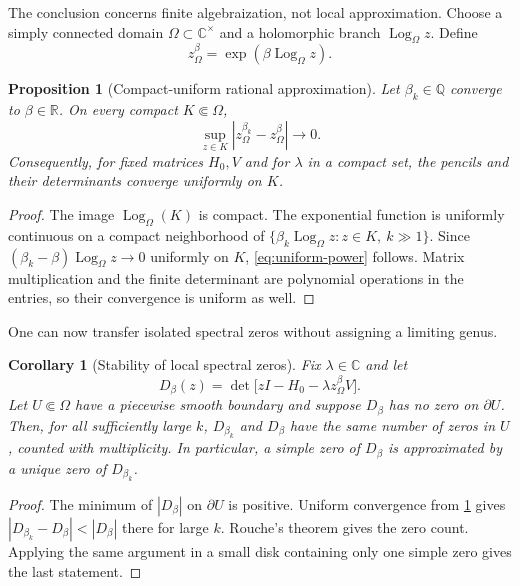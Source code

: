 \documentclass[11pt,reqno]{amsart}
\newtheorem{proposition}[theorem]{Proposition}
\newtheorem{corollary}[theorem]{Corollary}
\theoremstyle{remark}
\newcommand{\C}{\mathbb C}
\newcommand{\R}{\mathbb R}
\newcommand{\Q}{\mathbb Q}
\newcommand{\Log}{\operatorname{Log}}
\begin{document}
The conclusion concerns finite algebraization, not local approximation.
Choose a simply connected domain $\Omega\subset\C^\times$ and a holomorphic
branch $\Log_\Omega z$.  Define
\begin{equation}\label{eq:branch-power}
 z^\beta_\Omega=\exp(\beta\Log_\Omega z).
\end{equation}

\begin{proposition}[Compact-uniform rational approximation]
\label{prop:rational-approximation}
Let $\beta_k\in\Q$ converge to $\beta\in\R$.  On every compact
$K\Subset\Omega$,
\begin{equation}\label{eq:uniform-power}
 \sup_{z\in K}|z^{\beta_k}_\Omega-z^\beta_\Omega|\longrightarrow0.
\end{equation}
Consequently, for fixed matrices $H_0,V$ and for $\lambda$ in a compact set,
the pencils and their determinants converge uniformly on $K$.
\end{proposition}

\begin{proof}
The image $\Log_\Omega(K)$ is compact.  The exponential function is uniformly
continuous on a compact neighborhood of
$\{\beta_k\Log_\Omega z:z\in K,\ k\gg1\}$.  Since
$(\beta_k-\beta)\Log_\Omega z\to0$ uniformly on $K$,
\eqref{eq:uniform-power} follows.  Matrix multiplication and the finite
determinant are polynomial operations in the entries, so their convergence
is uniform as well.
\end{proof}

One can now transfer isolated spectral zeros without assigning a limiting
genus.

\begin{corollary}[Stability of local spectral zeros]\label{cor:zero-stability}
Fix $\lambda\in\C$ and let
\begin{equation}\label{eq:D-beta}
 D_\beta(z)=\det\bigl[zI-H_0-\lambda z^\beta_\Omega V\bigr].
\end{equation}
Let $U\Subset\Omega$ have a piecewise smooth boundary and suppose
$D_\beta$ has no zero on $\partial U$.  Then, for all sufficiently large
$k$, $D_{\beta_k}$ and $D_\beta$ have the same number of zeros in $U$,
counted with multiplicity.  In particular, a simple zero of $D_\beta$ is
approximated by a unique zero of $D_{\beta_k}$.
\end{corollary}

\begin{proof}
The minimum of $|D_\beta|$ on $\partial U$ is positive.  Uniform convergence
from \cref{prop:rational-approximation} gives
$|D_{\beta_k}-D_\beta|<|D_\beta|$ there for large $k$.  Rouche's theorem
gives the zero count.  Applying the same argument in a small disk containing
only one simple zero gives the last statement.
\end{proof}
\end{document}
